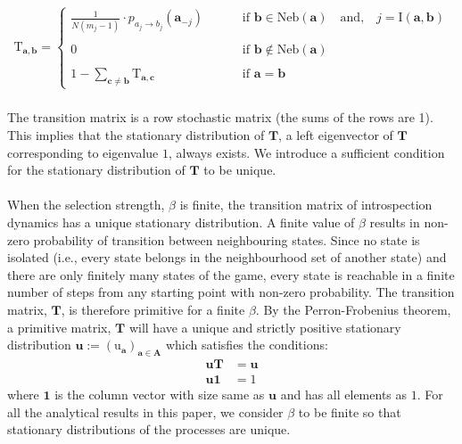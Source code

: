\documentclass[11pt]{article}
\theoremstyle{plainCl1}
\newtheorem{Prop}{Proposition}
\theoremstyle{plainCl2}
\newcommand{\A}{\mathbf{A}}
\newcommand{\abf}{\mathbf{a}}
\newcommand{\bbf}{\mathbf{b}}
\newcommand{\cbf}{\mathbf{c}}
\newcommand{\T}{\mathbf{T}}
\newcommand{\ubf}{\mathbf{u}}
\begin{document}
\begin{align}
\mathrm{T}_{\abf, \bbf} = 
\begin{cases}
\frac{1}{N(m_j-1)}  \cdot p_{a_{j} \to b_{j}} (\abf_{-j}) \quad  \quad &\text{ if }\bbf \in \mathrm{Neb}(\abf) \quad \text{and,} \quad j = \mathrm{I}(\abf,\bbf)\\ \\ 
0 \quad &\text{ if } \bbf \notin \mathrm{Neb}(\abf) \\ \\
1 - \sum_{\cbf \neq \bbf} \mathrm{T}_{\abf,\cbf} \quad &\text{ if } \abf = \bbf
\end{cases}
\label{Eq:transition-matrix}
\end{align} \\ 
\noindent The transition matrix is a row stochastic matrix (the sums of the rows are 1). This implies that the stationary distribution of $\T$, a left eigenvector of $\T$ corresponding to eigenvalue $1$, always exists. We introduce a sufficient condition for the stationary distribution of $\T$ to be unique. 
\\ \\
\noindent When the selection strength, $\beta$ is finite, the transition matrix of introspection dynamics has a unique stationary distribution. A finite value of $\beta$ results in non-zero probability of transition between neighbouring states. Since no state is isolated (i.e., every state belongs in the neighbourhood set of another state) and there are only finitely many states of the game, every state is reachable in a finite number of steps from any starting point with non-zero probability. The transition matrix, $\T$, is therefore primitive for a finite $\beta$. By the Perron-Frobenius theorem, a primitive matrix, $\T$ will have a unique and strictly positive stationary distribution $\ubf := (\mathrm{u}_\abf)_{\abf \in \A}$ which satisfies the conditions: 
\begin{eqnarray}
\label{Eq:lefteigenvector}
\ubf \T &= \ubf \\ 
\label{Eq:normalizationcondition}
\ubf \mathbf{1} &= 1
\end{eqnarray}
\noindent where $\mathbf{1}$ is the column vector with size same as $\ubf$ and has all elements as $1$. For all the analytical results in this paper, we consider $\beta$ to be finite so that stationary distributions of the processes are unique. \\ \\
\end{document}
